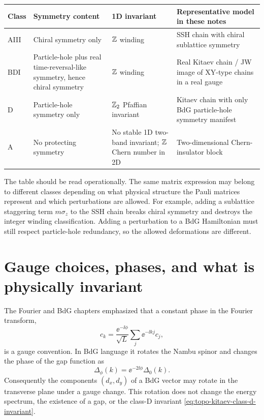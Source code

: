 \begin{center}
\small
\begin{tabular}{L{0.15\textwidth}L{0.22\textwidth}L{0.21\textwidth}L{0.28\textwidth}}
\toprule
Class & Symmetry content & 1D invariant & Representative model in these notes \\
\midrule
AIII & Chiral symmetry only & $\mathbb{Z}$ winding & SSH chain with chiral sublattice symmetry \\
BDI & Particle-hole plus real time-reversal-like symmetry, hence chiral symmetry & $\mathbb{Z}$ winding & Real Kitaev chain / JW image of XY-type chains in a real gauge \\
D & Particle-hole symmetry only & $\mathbb{Z}_2$ Pfaffian invariant & Kitaev chain with only BdG particle-hole symmetry manifest \\
A & No protecting symmetry & No stable 1D two-band invariant; $\mathbb{Z}$ Chern number in 2D & Two-dimensional Chern-insulator block \\
\bottomrule
\end{tabular}
\end{center}

The table should be read operationally.  The same matrix expression may belong
to different classes depending on what physical structure the Pauli matrices
represent and which perturbations are allowed.  For example, adding a sublattice
staggering term $m\sigma_z$ to the SSH chain breaks chiral symmetry and destroys
the integer winding classification.  Adding a perturbation to a BdG Hamiltonian
must still respect particle-hole redundancy, so the allowed deformations are
different.

\section{Gauge choices, phases, and what is physically invariant}
\label{sec:topo-gauge-phases}

The Fourier and BdG chapters emphasized that a constant phase in the Fourier
transform,
\begin{equation}
\label{eq:topo-fourier-gauge-reminder}
    c_k=\frac{\ee^{-\ii\phi}}{\sqrt{L}}\sum_j\ee^{-\ii k j}c_j,
\end{equation}
is a gauge convention.  In BdG language it rotates the Nambu spinor and changes
the phase of the gap function as
\begin{equation}
\label{eq:topo-gap-gauge-rotation}
    \Delta_\phi(k)=\ee^{-2\ii\phi}\Delta_0(k).
\end{equation}
Consequently the components $(d_x,d_y)$ of a BdG vector may rotate in the
transverse plane under a gauge change.  This rotation does not change the energy
spectrum, the existence of a gap, or the class-D invariant
\cref{eq:topo-kitaev-class-d-invariant}.

